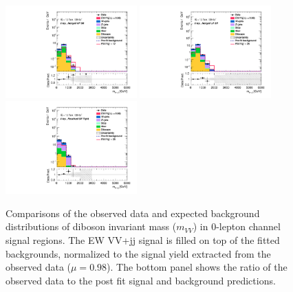 \begin{figure}[]
    \centering
    \includegraphics[width=0.45\textwidth]{figures/PostFit/Region_distMtvvJ_DSRVBSHP_BMin0_J0_incJet1_L0_T0_incFat1_Y6051_incTag1_Fat1_GlobalFit_unconditionnal_mu1log.pdf}
    \includegraphics[width=0.45\textwidth]{figures/PostFit/Region_distMtvvJ_DSRVBSLP_BMin0_J0_incJet1_L0_T0_incFat1_Y6051_incTag1_Fat1_GlobalFit_unconditionnal_mu1log.pdf}
    \includegraphics[width=0.45\textwidth]{figures/PostFit/Region_distMtvvjj_DSRVBSFid_BMin0_T0_Y6051_incTag1_J2_L0_incJet1_GlobalFit_unconditionnal_mu1log.pdf}
      \caption{Comparisons of the observed data and expected background distributions of diboson invariant mass ($m_{VV}$) in 0-lepton channel signal regions. The EW VV+jj signal is filled on top of the fitted backgrounds, normalized to the signal yield extracted from the observed data ($\mu = 0.98$). The bottom panel shows the ratio of the observed data to the post fit signal and background predictions.}
      \label{fig:postSR0lepmvv}
\end{figure}
